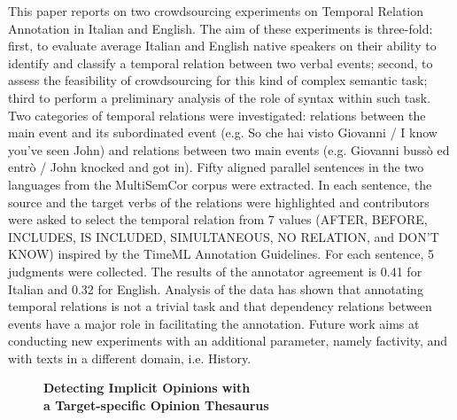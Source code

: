 \documentclass[10pt, a4paper, twopage, headinclude, footinclude, BCOR5mm]{book}
\begin{document}
\begin{table}[t!]
\end{table} 
\noindent
This paper reports on two crowdsourcing experiments on Temporal Relation Annotation in Italian and English. The aim of these experiments is three-fold: first, to evaluate average Italian and English native speakers on their ability to identify and classify a temporal relation between two verbal events; second, to assess the feasibility of crowdsourcing for this kind of complex semantic task; third to perform a preliminary analysis of the role of syntax within such task. Two categories of temporal relations were investigated: relations between the main event and its subordinated event (e.g. So che hai visto Giovanni / I know you’ve seen John) and relations between two main events (e.g. Giovanni bussò ed entrò / John knocked and got in). Fifty aligned parallel sentences in the two languages from the MultiSemCor corpus were extracted. In each sentence, the source and the target verbs of the relations were highlighted and contributors were asked to select the temporal relation from 7 values (AFTER, BEFORE, INCLUDES, IS INCLUDED, SIMULTANEOUS, NO RELATION, and DON’T KNOW) inspired by the TimeML Annotation Guidelines. For each sentence, 5 judgments were collected. The results of the annotator agreement is 0.41 for Italian and 0.32 for English. Analysis of the data has shown that annotating temporal relations is not a trivial task and that dependency relations between events have a major role in facilitating the annotation. Future work aims at conducting new experiments with an additional parameter, namely factivity, and with texts in a different domain, i.e. History.   

\newpage

\begin{figure}[t!]
\centering
\large\textbf{Detecting Implicit Opinions with \\ a Target-specific Opinion Thesaurus}
\vspace*{0.5cm}
\end{figure}
\end{document}
